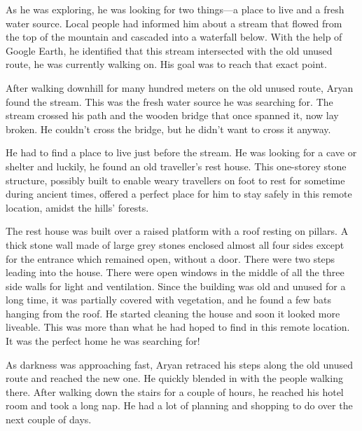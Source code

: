 As he was exploring, he was looking for two things—a place to live and a fresh water 
source. Local people had informed him about a stream that flowed from the top of the 
mountain and cascaded into a waterfall below. With the help of Google Earth, he identified
that this stream intersected with the old unused route, he was currently walking on.
His goal was to reach that exact point.

After walking downhill for many hundred meters on the old unused route, Aryan found
the stream. This was the fresh water source he was searching for. The stream
crossed his path and the wooden bridge that once spanned it, now lay broken. He
couldn't cross the bridge, but he didn't want to cross it anyway.

He had to find a place to live just before the stream. He was
looking for a cave or shelter and luckily, he found an old traveller's rest
house. This one-storey stone structure, possibly built to enable weary travellers on
foot to rest for sometime during ancient times, offered a perfect place for
him to stay safely in this remote location, amidst the hills' forests.

The rest house was built over a raised platform with a roof resting on pillars. A thick
stone wall made of large grey stones enclosed almost all four sides except
for the entrance which remained open, without a door. There were two steps leading
into the house. There were open windows in the middle of all the three side walls
for light and ventilation. Since the building was old and unused for a long
time, it was partially covered with vegetation, and he found a few bats hanging from the roof. He started cleaning the house and soon it looked more liveable. This was more than 
what he had hoped to find in this remote location. It was the perfect home he was
searching for!

As darkness was approaching fast, Aryan retraced his steps along the old
unused route and reached the new one. He quickly blended in with the people walking there.
After walking down the stairs for a couple of hours, he reached his hotel room and took a 
long nap. He had a lot of planning and shopping to do over the next couple of days.